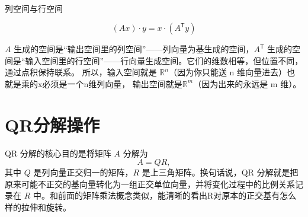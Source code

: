 \\
列空间与行空间


\[
(Ax) \cdot y = x \cdot (A^{\mathsf T} y)
\]

$A$ 生成的空间是“输出空间里的列空间”——列向量为基生成的空间，$A^{\mathsf T}$ 生成的空间是“输入空间里的行空间”——行向量生成空间。它们的维数相等，但位置不同，通过点积保持联系。
所以，输入空间就是 $\mathbb{R}^n$（因为你只能送 n 维向量进去）也就是乘的x必须是一个n维列向量，
输出空间就是$ \mathbb{R}^m$（因为出来的永远是 m 维）。

\section{QR分解操作}
QR 分解的核心目的是将矩阵 $A$ 分解为
\[
A = QR,
\]
其中 $Q$ 是列向量正交归一的矩阵，$R$ 是上三角矩阵。换句话说，QR 分解就是把原来可能不正交的基向量转化为一组正交单位向量，并将变化过程中的比例关系记录在 $R$ 中。和前面的矩阵乘法概念类似，能清晰的看出R对原本的正交基有怎么样的拉伸和旋转。

